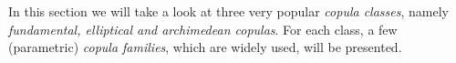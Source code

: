 
In this section we will take a look at three very popular \textit{copula classes}, namely \textit{fundamental, elliptical and archimedean copulas}. For each class, a few (parametric) \textit{copula families}, which are widely used, will be presented.